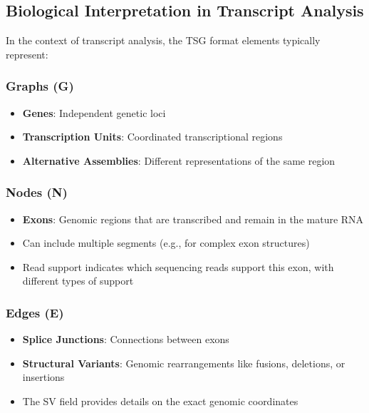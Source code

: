 \documentclass[11pt,a4paper]{article}
\begin{document}
\subsection{Biological Interpretation in Transcript Analysis}

In the context of transcript analysis, the TSG format elements typically represent:

\subsubsection{Graphs (G)}

\begin{itemize}[leftmargin=*]
	\item \textbf{Genes}: Independent genetic loci
	\item \textbf{Transcription Units}: Coordinated transcriptional regions
	\item \textbf{Alternative Assemblies}: Different representations of the same region
\end{itemize}

\subsubsection{Nodes (N)}

\begin{itemize}[leftmargin=*]
	\item \textbf{Exons}: Genomic regions that are transcribed and remain in the mature RNA
	\item Can include multiple segments (e.g., for complex exon structures)
	\item Read support indicates which sequencing reads support this exon, with different types of support
\end{itemize}

\subsubsection{Edges (E)}

\begin{itemize}[leftmargin=*]
	\item \textbf{Splice Junctions}: Connections between exons
	\item \textbf{Structural Variants}: Genomic rearrangements like fusions, deletions, or insertions
	\item The SV field provides details on the exact genomic coordinates
\end{itemize}
\end{document}
